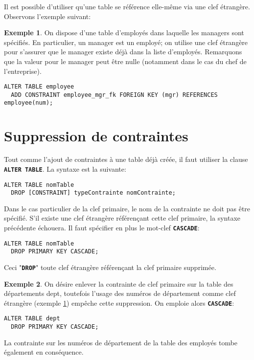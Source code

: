 \documentclass[a4paper, 12pt]{report}
\newcommand{\textSQL}[1]{\texttt{\textbf{#1}}}
\theoremstyle{definition} \newtheorem{ex}{Exemple}
\begin{document}
Il est possible d'utiliser qu'une table se référence elle-même via une clef étrangère. Observons l'exemple suivant:
\begin{ex} \label{ex:fk}
On dispose d'une table d'employés dans laquelle les managers sont spécifiés. En particulier, un manager est un employé; on utilise une clef étrangère pour s'assurer que le manager existe déjà dans la liste d'employés. Remarquons que la valeur pour le manager peut être nulle (notamment dans le cas du chef de l'entreprise).
\begin{lstlisting}[frame=single]
ALTER TABLE employee
  ADD CONSTRAINT employee_mgr_fk FOREIGN KEY (mgr) REFERENCES employee(num);
\end{lstlisting}
\end{ex}


\section{Suppression de contraintes}
Tout comme l'ajout de contraintes à une table déjà créée, il faut utiliser la clause \textSQL{ALTER TABLE}. La syntaxe est la suivante:
\begin{lstlisting}[frame=single]
ALTER TABLE nomTable
  DROP [CONSTRAINT] typeContrainte nomContrainte;
\end{lstlisting}

Dans le cas particulier de la clef primaire, le nom de la contrainte ne doit pas être spécifié. S'il existe une clef étrangère référençant cette clef primaire, la syntaxe précédente échouera. Il faut spécifier en plus le mot-clef \textSQL{CASCADE}:
\begin{lstlisting}[frame=single]
ALTER TABLE nomTable
  DROP PRIMARY KEY CASCADE;
\end{lstlisting}
Ceci "\textSQL{DROP}" toute clef étrangère référençant la clef primaire supprimée. 

\begin{ex}
On désire enlever la contrainte de clef primaire sur la table des départements dept, toutefois l'usage des numéros de département comme clef étrangère (exemple \ref{ex:fk})  empêche cette suppression. On emploie alors \textSQL{CASCADE}:
\begin{lstlisting}[frame=single]
ALTER TABLE dept
  DROP PRIMARY KEY CASCADE;
\end{lstlisting}

La contrainte sur les numéros de département de la table des employés tombe également en conséquence.
\end{ex}
\end{document}
